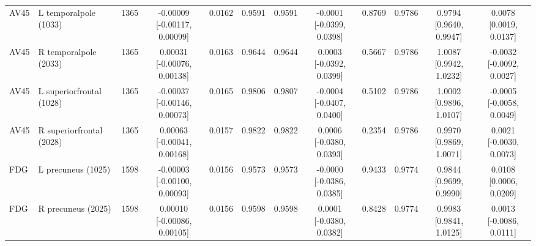 \documentclass{article}
\begin{document}
\begin{landscape}
\begin{table}[p]
{\begin{tabular}{llrccccccccc}
AV45 & L temporalpole (1033) & 1365 & \shortstack{-0.00009\\{}[-0.00117, 0.00099]} & 0.0162 & 0.9591 & 0.9591 & \shortstack{-0.0001\\{}[-0.0399, 0.0398]} & 0.8769 & 0.9786 & \shortstack{0.9794\\{}[0.9640, 0.9947]} & \shortstack{0.0078\\{}[0.0019, 0.0137]} \\
AV45 & R temporalpole (2033) & 1365 & \shortstack{0.00031\\{}[-0.00076, 0.00138]} & 0.0163 & 0.9644 & 0.9644 & \shortstack{0.0003\\{}[-0.0392, 0.0399]} & 0.5667 & 0.9786 & \shortstack{1.0087\\{}[0.9942, 1.0232]} & \shortstack{-0.0032\\{}[-0.0092, 0.0027]} \\
AV45 & L superiorfrontal (1028) & 1365 & \shortstack{-0.00037\\{}[-0.00146, 0.00073]} & 0.0165 & 0.9806 & 0.9807 & \shortstack{-0.0004\\{}[-0.0407, 0.0400]} & 0.5102 & 0.9786 & \shortstack{1.0002\\{}[0.9896, 1.0107]} & \shortstack{-0.0005\\{}[-0.0058, 0.0049]} \\
AV45 & R superiorfrontal (2028) & 1365 & \shortstack{0.00063\\{}[-0.00041, 0.00168]} & 0.0157 & 0.9822 & 0.9822 & \shortstack{0.0006\\{}[-0.0380, 0.0393]} & 0.2354 & 0.9786 & \shortstack{0.9970\\{}[0.9869, 1.0071]} & \shortstack{0.0021\\{}[-0.0030, 0.0073]} \\
FDG & L precuneus (1025) & 1598 & \shortstack{-0.00003\\{}[-0.00100, 0.00093]} & 0.0156 & 0.9573 & 0.9573 & \shortstack{-0.0000\\{}[-0.0386, 0.0385]} & 0.9433 & 0.9774 & \shortstack{0.9844\\{}[0.9699, 0.9990]} & \shortstack{0.0108\\{}[0.0006, 0.0209]} \\
FDG & R precuneus (2025) & 1598 & \shortstack{0.00010\\{}[-0.00086, 0.00105]} & 0.0156 & 0.9598 & 0.9598 & \shortstack{0.0001\\{}[-0.0380, 0.0382]} & 0.8428 & 0.9774 & \shortstack{0.9983\\{}[0.9841, 1.0125]} & \shortstack{0.0013\\{}[-0.0086, 0.0111]} \\

\end{tabular}}
\end{table}
\end{landscape}
\end{document}
